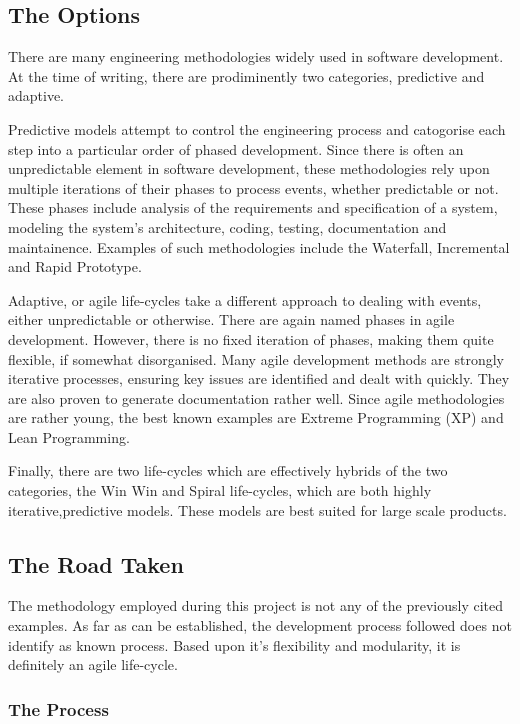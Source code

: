 
\subsection{The Options}

There are many engineering methodologies widely used in software
development. At the time of writing, there are prodiminently two
categories, predictive and adaptive.


Predictive models attempt to control the engineering process and
catogorise each step into a particular order of phased development. 
Since there is often an unpredictable element in software development, 
these methodologies rely upon multiple iterations of their phases to 
process events, whether predictable or not. These phases include 
analysis of the requirements and specification of a system, modeling 
the system's architecture, coding, testing, documentation and 
maintainence. Examples of such methodologies include the Waterfall, 
Incremental and Rapid Prototype.


Adaptive, or agile life-cycles take a different approach to dealing 
with events, either unpredictable or otherwise. There are again named 
phases in agile development. However, there is no fixed iteration of 
phases, making them quite flexible, if somewhat disorganised. Many 
agile development methods are strongly iterative processes, ensuring key 
issues are identified and dealt with quickly. They are also proven to
generate documentation rather well. Since agile methodologies are rather 
young, the best known examples are Extreme Programming (XP) and Lean 
Programming.


Finally, there are two life-cycles which are effectively hybrids of the
two categories, the Win Win and Spiral life-cycles, which are both highly
iterative,predictive models. These models are best suited for large
scale products.

\subsection{The Road Taken}

The methodology employed during this project is not any of the
previously cited examples. As far as can be established, the development
process followed does not identify as known process. Based upon it's
flexibility and modularity, it is definitely an agile life-cycle.

\subsubsection{The Process}

